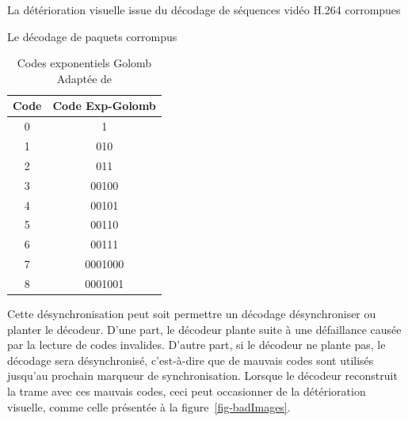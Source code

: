 \documentclass[letterpaper, twoside, 12pt,memoire]{thETS}
\newcommand{\fig}[1]{figure~\ref{#1}}
\begin{document}
\begin{chapter}{La détérioration visuelle issue du décodage de séquences vidéo
H.264 corrompues}
\begin{section}{Le décodage de paquets corrompus}
\begin{table}[!htb]
\caption{Codes exponentiels Golomb \\Adaptée de
\citet[p.~11]{Ikuno2007}}
\vspace{-1em}
\label{tab-ExpGolomb}
\centering
  \begin{tabular}{| c | c | }
    \hline
    Code & Code Exp-Golomb\\
    \hline
    0 & 1\\ \hline
    1 & 010\\ \hline
    2 & 011\\ \hline
    3 & 00100\\ \hline
    4 & 00101\\ \hline
    5 & 00110\\ \hline
    6 & 00111\\ \hline
    7 & 0001000\\ \hline
    8 & 0001001\\ \hline
  \end{tabular}
\end{table}

Cette désynchronisation peut soit permettre un décodage désynchroniser ou
planter le décodeur. D'une part, le décodeur plante suite à une défaillance causée
par la lecture de codes invalides. D'autre part, si le décodeur ne plante pas, le décodage sera
désynchronisé, c'est-à-dire que de mauvais codes sont utilisés jusqu'au prochain
marqueur de synchronisation. Lorsque le décodeur reconstruit la trame avec ces
mauvais codes, ceci peut occasionner de la détérioration visuelle, comme celle
présentée à la \fig{fig-badImages}.


\end{section}
\end{chapter}
\end{document}
